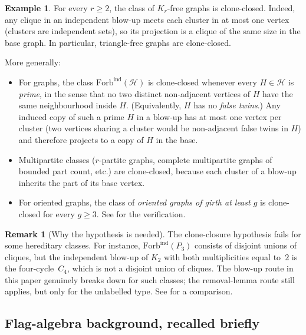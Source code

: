 \documentclass[11pt]{article}
\theoremstyle{definition}
\newtheorem{example}[theorem]{Example}
\newtheorem{remark}[theorem]{Remark}
\begin{document}
\begin{example}\label{ex:Kr-free-clone-closed}
For every $r\ge 2$, the class of $K_r$-free graphs is clone-closed.
Indeed, any clique in an independent blow-up meets each cluster in at
most one vertex (clusters are independent sets), so its projection is a
clique of the same size in the base graph.  In particular,
triangle-free graphs are clone-closed.

More generally:
\begin{itemize}[leftmargin=2em]
\item For graphs, the class $\mathrm{Forb}^{\mathrm{ind}}(\mathcal H)$ is
clone-closed whenever every $H\in\mathcal H$ is \emph{prime}, in the
sense that no two distinct non-adjacent vertices of $H$ have the same
neighbourhood inside $H$.  (Equivalently, $H$ has no \emph{false twins}.)
Any induced copy of such a prime $H$ in a blow-up has at most one vertex
per cluster (two vertices sharing a cluster would be non-adjacent false
twins in $H$) and therefore projects to a copy of $H$ in the base.
\item Multipartite classes ($r$-partite graphs, complete multipartite
graphs of bounded part count, etc.) are clone-closed, because each
cluster of a blow-up inherits the part of its base vertex.
\item For oriented graphs, the class of \emph{oriented graphs of girth
at least $g$} is clone-closed for every $g\ge 3$.  See
 for the verification.
\end{itemize}
\end{example}

\begin{remark}[Why the hypothesis is needed]\label{rmk:why-hypothesis}
The clone-closure hypothesis fails for some hereditary classes.
For instance, $\mathrm{Forb}^{\mathrm{ind}}(P_3)$ consists of disjoint
unions of cliques, but the independent blow-up of $K_2$ with both
multiplicities equal to~$2$ is the four-cycle~$C_4$, which is not a
disjoint union of cliques.  The blow-up route in this paper genuinely
breaks down for such classes; the removal-lemma route still applies, but
only for the unlabelled type.  See  for a
comparison.
\end{remark}

\subsection{Flag-algebra background, recalled briefly}
\end{document}
